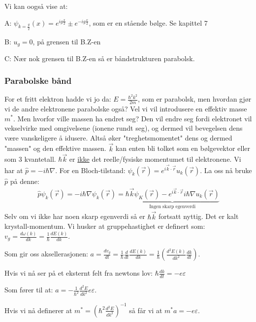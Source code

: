 \documentclass{article}
\begin{document}
Vi kan oogså vise at: 

A: $\psi_{k = \frac{g}{2}}(x) = e^{i g \frac{x}{2}} \pm e^{-ig\frac{x}{2}}$, som er en stående bølge. Se kapittel 7

B: $u_g = 0$, på grensen til B.Z-en

C: Nær nok grensen til B.Z-en så er båndstrukturen parabolsk.

\subsubsection{Parabolske bånd}
For et fritt elektron hadde vi jo da: $E = \frac{\hbar^2 k^2}{2m}$, som er parabolsk, men hvordan gjør vi de andre elektronene parabolske også? Vel vi vil introdusere en effektiv masse $m^*$. Men hvorfor ville massen ha endret seg? Den vil endre seg fordi elektronet vil vekselvirke med omgivelsene (ionene rundt seg), og dermed vil bevegelsen dens være vanskeligere å idusere. Altså øker "treghetsmomentet" dens og dermed "massen" og den effektive massen.
$\vec{k}$ kan enten bli tolket som en bølgevektor eller som 3 kvantetall. $\hbar\vec{k}$ er \underline{ikke} det reelle/fysiske momentumet til elektronene. Vi har at $\hat{p} = -i \hbar \nabla$. For en Bloch-tilstand: $\psi_k(\vec{r}) = e^{i \vec{k} \cdot \vec{r}} u_k(\vec{r})$. La oss nå bruke $\hat{p}$ på denne:
\begin{align*}
  \hat{p} \psi_k(\vec{r}) = -i \hbar \nabla \psi_k(\vec{r}) = \underbrace{\hbar \vec{k} \psi_K (\vec{r}) - e^{i \vec{k} \cdot \vec{r}} i \hbar \nabla u_k(\vec{r})}_{\text{Ingen skarp egenverdi}}
\end{align*}
Selv om vi ikke har noen skarp egenverdi så er $\hbar \vec{k}$ fortsatt nyttig. Det er kalt krystall-momentum.
Vi husker at gruppehastighet er definert som: $v_g = \frac{d \omega(k)}{dk} = \frac{1}{\hbar} \frac{dE(k)}{dk}$.

Som gir oss aksellerasjonen: $a = \frac{d v_g}{dt} = \frac{1}{\hbar} \frac{d}{dt} \frac{dE(k)}{dk} = \frac{1}{\hbar}\left (\frac{d^2 E(k)}{dk^2} \frac{dk}{dt}\right)$.

Hvis vi nå ser på et eksternt felt fra newtons lov: $\hbar \frac{dk}{dt} = -e \varepsilon$

Som fører til at: $a = -\frac{1}{\hbar^2} \frac{d^2 E}{dk^2} e \varepsilon$.

Hvis vi nå definerer at $m^* = \left(\hbar^2 \frac{d^2 E}{dk^2}\right)^{-1}$ så får vi at $m^*a=-e\varepsilon$.
\end{document}
